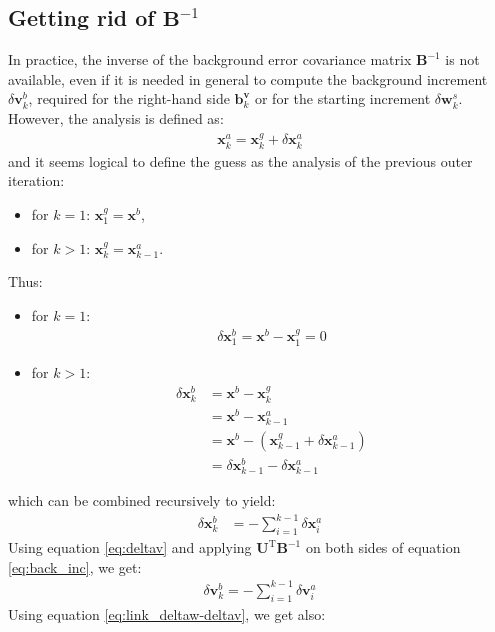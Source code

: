 \documentclass[12pt]{scrartcl}
\begin{document}
\subsection{Getting rid of $\mathbf{B}^{-1}$}
In practice, the inverse of the background error covariance matrix $\mathbf{B}^{-1}$ is not available, even if it is needed in general to compute the background increment $\delta \mathbf{v}^b_k$, required for the right-hand side $\mathbf{b}^\mathbf{v}_k$ or for the starting increment $\delta \mathbf{w}^s_k$. However, the analysis is defined as:
\begin{align}
\mathbf{x}^a_k = \mathbf{x}^g_k + \delta \mathbf{x}^a_k
\end{align}
and it seems logical to define the guess as the analysis of the previous outer iteration:
\begin{itemize}
\item for $k = 1$: $\mathbf{x}^g_1 = \mathbf{x}^b$,
\item for $k > 1$: $\mathbf{x}^g_k = \mathbf{x}^a_{k-1}$.
\end{itemize}
Thus:
\begin{itemize}
\item for $k = 1$:
\begin{align}
\delta \mathbf{x}^b_1 = \mathbf{x}^b - \mathbf{x}^g_1 = 0
\end{align}
\item for $k > 1$:
\begin{align}
\delta \mathbf{x}^b_k & = \mathbf{x}^b - \mathbf{x}^g_k \nonumber \\
& = \mathbf{x}^b - \mathbf{x}^a_{k-1} \nonumber \\
& = \mathbf{x}^b - \left(\mathbf{x}^g_{k-1} + \delta \mathbf{x}^a_{k-1}\right) \nonumber \\
& = \delta \mathbf{x}^b_{k-1} - \delta \mathbf{x}^a_{k-1}
\end{align}
\end{itemize}
which can be combined recursively to yield:
\begin{align}
\label{eq:back_inc}
\delta \mathbf{x}^b_k & = - \sum_{i=1}^{k-1} \delta \mathbf{x}^a_i
\end{align}
Using equation \eqref{eq:deltav} and applying $\mathbf{U}^\mathrm{T} \mathbf{B}^{-1}$ on both sides of equation \eqref{eq:back_inc}, we get:
\begin{align}
\label{eq:back_inc_U}
\boxed{\delta \mathbf{v}^b_k = - \sum_{i=1}^{k-1} \delta \mathbf{v}^a_i}
\end{align}
Using equation \eqref{eq:link_deltaw-deltav}, we get also:
\end{document}
